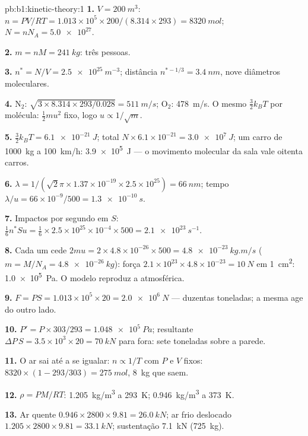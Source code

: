 \begin{solution}{pb:b1:kinetic-theory:1}
\textbf{1.} $V = \qty{200}{m^3}$: $n = PV/RT = 1.013\times10^5 \times 200/(8.314
\times 293) = \qty{8320}{mol}$; $N = nN_A = \num{5.0e27}$.

\textbf{2.} $m = nM = \qty{241}{kg}$: três pessoas.

\textbf{3.} $n^* = N/V = \qty{2.5e25}{m^{-3}}$; distância $n^{*-1/3} = \qty{3.4}{nm}$,
nove diâmetros moleculares.

\textbf{4.} N$_2$: $\sqrt{3 \times 8.314 \times 293/0.028} = \qty{511}{m/s}$;
O$_2$: \qty{478}{m/s}. O mesmo $\tfrac32 k_BT$ por molécula: $\tfrac12 mu^2$ fixo,
logo $u \propto 1/\sqrt m$.

\textbf{5.} $\tfrac32 k_BT = \qty{6.1e-21}{J}$; total $N \times 6.1\times10^{-21}
= \qty{3.0e7}{J}$; um carro de \qty{1000}{kg} a \qty{100}{km/h}: \qty{3.9e5}{J} ---
o movimento molecular da sala vale oitenta carros.

\textbf{6.} $\lambda = 1/(\sqrt2\pi \times 1.37\times10^{-19} \times 2.5\times10^{25})
= \qty{66}{nm}$; tempo $\lambda/u = 66\times10^{-9}/500 = \qty{1.3e-10}{s}$.

\textbf{7.} Impactos por segundo em $S$: $\tfrac16 n^*Su = \tfrac16 \times 2.5\times
10^{25} \times 10^{-4} \times 500 = \qty{2.1e23}{s^{-1}}$.

\textbf{8.} Cada um cede $2mu = 2 \times 4.8\times10^{-26} \times 500 = \qty{4.8e-23}{kg.m/s}$
($m = M/N_A = \qty{4.8e-26}{kg}$): força $2.1\times10^{23} \times 4.8\times10^{-23}
= \qty{10}{N}$ em \qty{1}{cm^2}: \qty{1.0e5}{Pa}. O modelo reproduz a
 atmosférica.

\textbf{9.} $F = PS = 1.013\times10^5 \times 20 = \qty{2.0e6}{N}$ --- duzentas
toneladas; a mesma  age do outro lado.

\textbf{10.} $P' = P \times 303/293 = \qty{1.048e5}{Pa}$; resultante $\Delta P\,S = 3.5
\times10^3 \times 20 = \qty{70}{kN}$ para fora: sete toneladas sobre a parede.

\textbf{11.} O ar sai até a  se igualar: $n \propto 1/T$ com $P$ e $V$
fixos: $8320 \times (1 - 293/303) = \qty{275}{mol}$, \qty{8}{kg} que
saem.

\textbf{12.} $\rho = PM/RT$: \qty{1.205}{kg/m^3} a \qty{293}{K}; \qty{0.946}{kg/m^3}
a \qty{373}{K}.

\textbf{13.} Ar quente $0.946 \times 2800 \times 9.81 = \qty{26.0}{kN}$; ar frio
deslocado $1.205 \times 2800 \times 9.81 = \qty{33.1}{kN}$; sustentação \qty{7.1}{kN}
(\qty{725}{kg}).


\end{solution}
